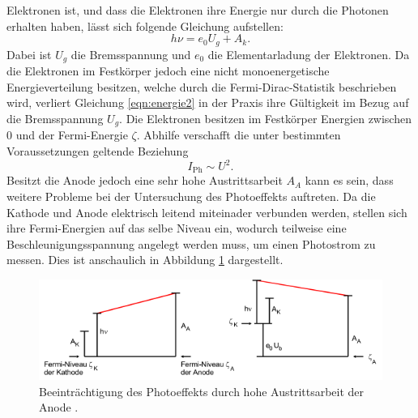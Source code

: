 Elektronen ist, und dass die Elektronen ihre Energie nur durch die Photonen erhalten haben, lässt sich folgende Gleichung aufstellen:
\begin{equation}
  h \nu = e_0 U_g + A_k .
  \label{eqn:energie2}
\end{equation}
Dabei ist $U_g$ die Bremsspannung und $e_0$ die Elementarladung der Elektronen.
Da die Elektronen im Festkörper jedoch eine nicht monoenergetische Energieverteilung besitzen, welche durch die Fermi-Dirac-Statistik beschrieben wird, verliert Gleichung \eqref{eqn:energie2} in der Praxis ihre Gültigkeit im Bezug auf
die Bremsspannung $U_g$. Die Elektronen besitzen im Festkörper Energien zwischen $0$ und der Fermi-Energie $\zeta$. Abhilfe verschafft die unter bestimmten Voraussetzungen geltende Beziehung
\begin{equation}
  I_\text{Ph} \sim U^2 .
  \label{eqn:ipropu}
\end{equation}
Besitzt die Anode jedoch eine sehr hohe Austrittsarbeit $A_A$ kann es sein, dass weitere Probleme bei der Untersuchung des Photoeffekts auftreten. Da die Kathode und Anode elektrisch leitend miteinader verbunden werden, stellen sich ihre
Fermi-Energien auf das selbe Niveau ein, wodurch teilweise eine Beschleunigungsspannung angelegt werden muss, um einen Photostrom zu messen. Dies ist anschaulich in Abbildung \ref{fig:AA} dargestellt.
\begin{figure}
  \centering
  \includegraphics{images/AA.png}
  \caption{Beeinträchtigung des Photoeffekts durch hohe Austrittsarbeit der Anode \cite{sample}.}
  \label{fig:AA}
\end{figure}
